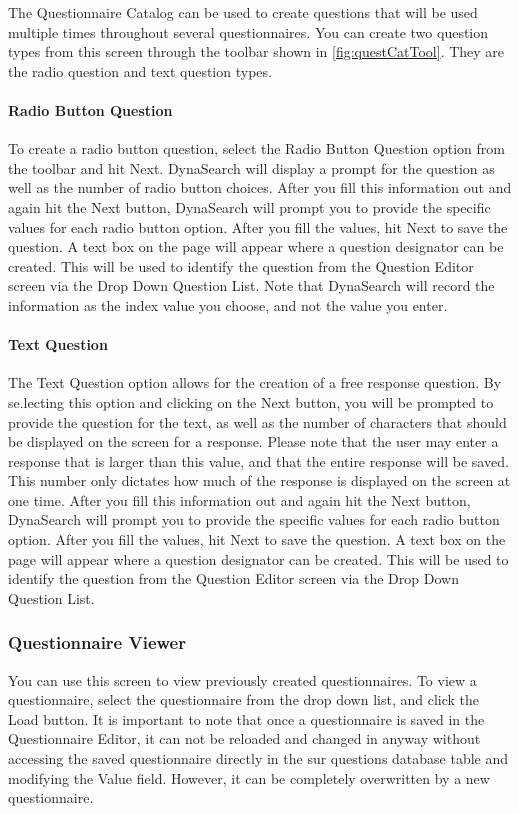 \documentclass[article]{ij4uq}              %
\begin{document}
The Questionnaire Catalog can be used to create questions that will be used multiple times throughout several questionnaires. You can create two question types from this screen through the toolbar shown in \ref{fig:questCatTool}. They are the radio question and text question types.

\paragraph{Radio Button Question}
To create a radio button question, select the Radio Button Question option from the toolbar and hit Next. DynaSearch will display a prompt for the question as well as the number of radio button choices. After you fill this information out and again hit the Next button, DynaSearch will prompt you to provide the specific values for each radio button option. 
After you fill the values, hit Next to save the question. A text box on the page will appear where a question designator can be created. This will be used to identify the question from the Question Editor screen via the Drop Down Question List. 
Note that DynaSearch will record the information as the index value you choose, and not the value you enter.

\paragraph{Text Question}
The Text Question option allows for the creation of a free response question. By se.lecting this option and clicking on the Next button, you will be prompted to provide the question for the text, as well as the number of characters that should be displayed on the screen for a response. Please note that the user may enter a response that is larger than this value, and that the entire response will be saved. This number only dictates how much of the response is displayed on the screen at one time. 
After you fill this information out and again hit the Next button, DynaSearch will prompt you to provide the specific values for each radio button option. After you fill the values, hit Next to save the question. A text box on the page will appear where a question designator can be created. This will be used to identify the question from the Question Editor screen via the Drop Down Question List.

\subsubsection{Questionnaire Viewer}
You can use this screen to view previously created questionnaires. To view a questionnaire, select the questionnaire from the drop down list, and click the Load button. 
It is important to note that once a questionnaire is saved in the Questionnaire Editor, it can not be reloaded and changed in anyway without accessing the saved questionnaire directly in the sur questions database table and modifying the Value field. However, it can be completely overwritten by a new questionnaire.
\end{document}
